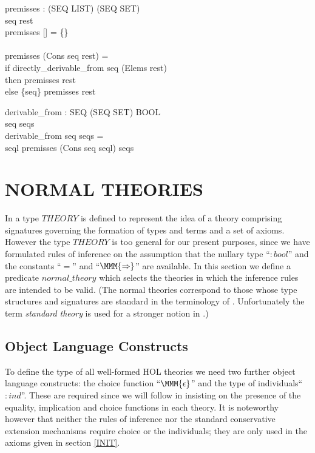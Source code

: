 \documentclass[a4paper,11pt,titlepage]{article}
\begin{document}
\begin{titlepage}
\begin{HOLConst}
\+	\PrNL{}premisses\PrNN{} :  (SEQ LIST) \MMM{\rightarrow} (SEQ SET)\\
\PrPH{}
\+	\MMM{\forall} seq rest \MMM{\bullet}\\
\+	premisses [] = \{\}\\
\+	\MMM{\land}\\
\+	premisses (Cons seq rest) =\\
\+	if directly\_derivable\_from seq (Elems rest)\\
\+	then premisses rest\\
\+	else \{seq\} \MMM{\cup} premisses rest\\
\end{HOLConst}


\begin{HOLConst}
\+	\PrNL{}derivable\_from\PrNN{} : SEQ \MMM{\rightarrow} (SEQ SET) \MMM{\rightarrow} BOOL\\
\PrPH{}
\+	\MMM{\forall} seq seqs \MMM{\bullet}\\
\+	derivable\_from seq seqs =\\
\+	\MMM{\exists} seql \MMM{\bullet} premisses (Cons seq seql) \MMM{\subseteq} seqs\\
\end{HOLConst}

\section{NORMAL THEORIES} \label{THEORIES}
In \cite{DS/FMU/IED/SPC001} a type $THEORY$ is defined
to represent the idea of a theory comprising signatures
governing the formation of types and terms and a set
of axioms. However the type $THEORY$ is too general
for our present purposes, since
we have formulated rules of inference on the assumption
that the nullary type ``${:}bool$'' and the
constants ``$=$'' and ``$\MMM{\Rightarrow}$'' are available.
In this section we define a predicate $normal\_theory$
which selects the theories in which the inference
rules are intended to be valid.
(The normal theories correspond to those whose type
structures and signatures are standard in the terminology
of \cite{SRI89a}. Unfortunately the term {\it standard
theory} is used for a stronger notion in \cite{SRI89a}.)

\subsection{Object Language Constructs}
To define the type of all well-formed HOL theories
we need two further object language constructs: the
choice function ``$\MMM{\epsilon}$'' and the type of individuals``$:ind$''.
These are required since we
will follow \cite{SRI89a} in insisting
on the presence of the equality, implication and
choice functions in each theory.
It is noteworthy however that neither the rules of inference
nor the standard
conservative extension mechanisms require
choice or the individuals; they are only used in the
axioms given in section \ref{INIT}.


\end{titlepage}
\end{document}
